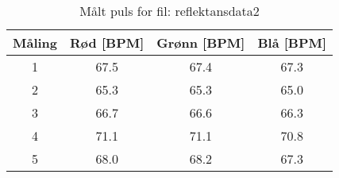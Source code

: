 
\begin{table}[H]
\centering
\caption{Målt puls for fil: reflektansdata2}
\label{tab:reflektansdata2}
\begin{tabular}{|c|c|c|c|}
\hline
\textbf{Måling} & \textbf{Rød [BPM]} & \textbf{Grønn [BPM]} & \textbf{Blå [BPM]} \\ \hline
1 & 67.5 & 67.4 & 67.3 \\ \hline
2 & 65.3 & 65.3 & 65.0 \\ \hline
3 & 66.7 & 66.6 & 66.3 \\ \hline
4 & 71.1 & 71.1 & 70.8 \\ \hline
5 & 68.0 & 68.2 & 67.3 \\ \hline
\end{tabular}
\end{table}
